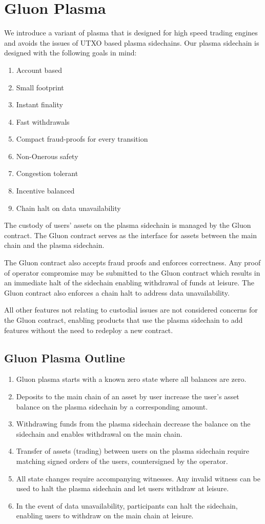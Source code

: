 \documentclass[12pt,a4paper]{article}
\begin{document}
\section{Gluon Plasma}
We introduce a variant of plasma that is designed for high speed trading engines and avoids the issues of UTXO based plasma sidechains. Our plasma sidechain is designed with the following goals in mind:
\begin{enumerate}
    \item Account based
    \item Small footprint
    \item Instant finality
    \item Fast withdrawals
    \item Compact fraud-proofs for every transition
    \item Non-Onerous safety
    \item Congestion tolerant
    \item Incentive balanced
    \item Chain halt on data unavailability
\end{enumerate}
The custody of users’ assets on the plasma sidechain is managed by the Gluon contract. The Gluon contract serves as the interface for assets between the main chain and the plasma sidechain.

The Gluon contract also accepts fraud proofs and enforces correctness. Any proof of operator compromise may be submitted to the Gluon contract which results in an immediate halt of the sidechain enabling withdrawal of funds at leisure. The Gluon contract also enforces a chain halt to address data unavailability.

All other features not relating to custodial issues are not considered concerns for the Gluon contract, enabling products that use the plasma sidechain to add features without the need to redeploy a new contract.
\subsection{Gluon Plasma Outline}
\begin{enumerate}
    \item Gluon plasma starts with a known zero state where all balances are zero.
    \item Deposits to the main chain of an asset by user increase the user’s asset balance on the plasma sidechain by a corresponding amount.
    \item Withdrawing funds from the plasma sidechain decrease the balance on the sidechain and enables withdrawal on the main chain.
    \item Transfer of assets (trading) between users on the plasma sidechain require matching signed orders of the users, countersigned by the operator.
    \item All state changes require accompanying witnesses. Any invalid witness can be used to halt the plasma sidechain and let users withdraw at leisure.
    \item In the event of data unavailability, participants can halt the sidechain, enabling users to withdraw on the main chain at leisure.
\end{enumerate}
\end{document}
